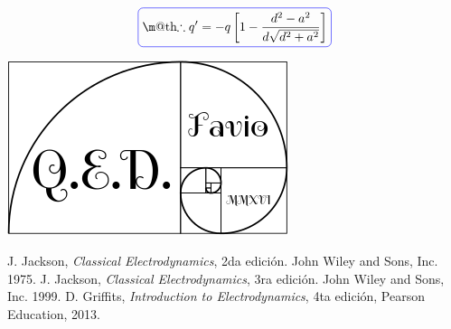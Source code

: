 \documentclass[a4paper,10pt]{article}
\makeatletter
\numberwithin{equation}{section}
\newcommand*{\boxcolor}{blue}
\renewcommand{\boxed}[1]{\textcolor{\boxcolor}{%
\tikz[baseline={([yshift=-1ex]current bounding box.center)}] \node [rectangle, minimum width=1ex,rounded corners,draw] {\normalcolor\m@th$\displaystyle#1$};}}
\makeatother
\begin{document}
\begin{equation}
 \boxed{\therefore q' = -q\left[1 - \frac{d^2 - a^2}{d\sqrt{d^2 + a^2}} \right]}
\end{equation}

\hspace{10cm}\includegraphics[scale=0.2]{logoQED}

\begin{thebibliography}{10}
J. Jackson, \emph{Classical Electrodynamics}, 2da edición. John Wiley and Sons, Inc. 
1975.
J. Jackson, \emph{Classical Electrodynamics}, 3ra edición. John Wiley and Sons, Inc. 
1999.
D. Griffits, \emph{Introduction to Electrodynamics}, 4ta edición, Pearson Education, 
2013.
\end{thebibliography}
\end{document}
